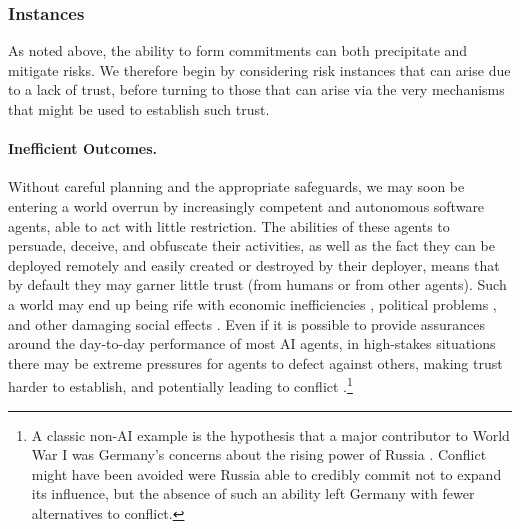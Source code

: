 \subsubsection{Instances}

As noted above, the ability to form commitments can both precipitate and mitigate risks.
We therefore begin by considering risk instances that can arise due to a lack of trust, before turning to those that can arise via the very mechanisms that might be used to establish such trust.

\paragraph{Inefficient Outcomes.}
Without careful planning and the appropriate safeguards, we may soon be entering a world overrun by increasingly competent and autonomous software agents, able to act with little restriction.
The abilities of these agents to persuade, deceive, and obfuscate their activities, as well as the fact they can be deployed remotely and easily created or destroyed by their deployer, means that by default they may garner little trust (from humans or from other agents).
Such a world may end up being rife with economic inefficiencies \citep{schmitz2001hold,Krier2023}, political problems \citep{Kreps2023,Csernatoni2024}, and other damaging social effects \citep{Gabriel2024}.
Even if it is possible to provide assurances around the day-to-day performance of most AI agents, in high-stakes situations there may be extreme pressures for agents to defect against others, making trust harder to establish, and potentially leading to conflict \citep[see also ]{fearon1995rationalist,powell2006war}.\footnote{A classic non-AI example is the hypothesis that a major contributor to World War I was Germany's concerns about the rising power of Russia \citep{02b46089-4baf-3ce5-9159-e4dbfc3050f6}. Conflict might have been avoided were Russia able to credibly commit not to expand its influence, but the absence of such an ability left Germany with fewer alternatives to conflict.}




    

    


    



